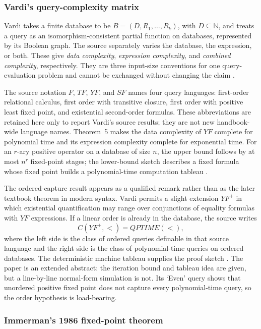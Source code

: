 \subsubsection{Vardi's query-complexity matrix}

Vardi takes a finite database to be
\(B=(D,R_1,\ldots,R_k)\), with \(D\subseteq\mathbb N\), and treats a query as
an isomorphism-consistent partial function on databases, represented by its
Boolean graph.  The source separately varies the database, the expression, or
both.  These give \emph{data complexity}, \emph{expression complexity}, and
\emph{combined complexity}, respectively.  They are three input-size
conventions for one query-evaluation problem and cannot be exchanged without
changing the claim \cite[pp.~137--139]{Vardi1982}.

The source notation \(F\), \(TF\), \(YF\), and \(SF\) names four query
languages: first-order relational calculus, first order with transitive
closure, first order with positive least fixed point, and existential
second-order formulas.  These abbreviations are retained here only to report
Vardi's source results; they are not new handbook-wide language names.
Theorem~5 makes the data complexity of \(YF\) complete for polynomial time and
its expression complexity complete for exponential time.  For an \(r\)-ary
positive operator on a database of size \(n\), the upper bound follows by at
most \(n^r\) fixed-point stages; the lower-bound sketch describes a fixed
formula whose fixed point builds a polynomial-time computation tableau
\cite[pp.~141--142]{Vardi1982}.

The ordered-capture result appears as a qualified remark rather than as the
later textbook theorem in modern syntax.  Vardi permits a slight extension
\(YF^+\) in which existential quantification may range over conjunctions of
equality formulas with \(YF\) expressions.  If a linear order is already in
the database, the source writes
\[
 C(YF^+,<)=QPTIME(<),
\]
where the left side is the class of ordered queries definable in that source
language and the right side is the class of polynomial-time queries on ordered
databases.  The deterministic machine tableau supplies the proof sketch
\cite[remark~2]{Vardi1982}.  The paper is an extended abstract: the iteration
bound and tableau idea are given, but a line-by-line normal-form simulation is
not.  Its `Even' query shows that unordered positive fixed point does not
capture every polynomial-time query, so the order hypothesis is load-bearing.

\subsubsection{Immerman's 1986 fixed-point theorem}

